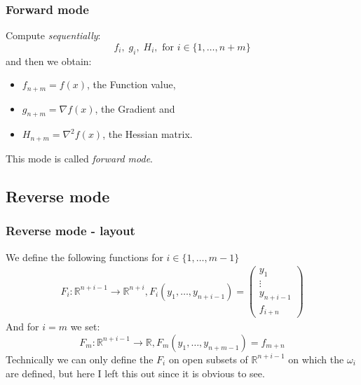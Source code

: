 \documentclass[compress]{beamer}
\def\R{{\mathbb R}}
\begin{document}
\begin{frame}
	\frametitle{Forward mode}

	Compute \textit{sequentially}:
	\[
		f_i, \; g_i, \; H_i, \text{ for } i \in \{
		1, \ldots, n+m
		\}
	\]
	and then we obtain:
	\vspace{5mm}
	\begin{itemize}
		\item $f_{n+m} = f(x)$, the Function value,
		\item $g_{n+m} = \nabla f(x)$, the Gradient and
		\item $H_{n+m} = \nabla ^2 f(x)$, the Hessian matrix.
	\end{itemize}
	\vspace{5mm}
	This mode is called \textit{forward mode}.
\end{frame}

\subsection{Reverse mode}
\begin{frame}
	\frametitle{Reverse mode - layout}

	We define the following functions for $i \in \{
		1, \ldots, m-1
		\} $
	\begin{align*}
		F_i : \R^{n+i - 1} \to \R^{n+i},
		F_i (y_1, \ldots, y_{n+i-1}) =
		\begin{pmatrix}
			y_1       \\
			\vdots    \\
			y_{n+i-1} \\
			f_{i+n}
		\end{pmatrix}
	\end{align*}
	And for $i=m$ we set:
	\[
		F_m : \R^{n+i - 1} \to \R,
		F_m \left(
		y_1, \ldots, y_{n+m-1}
		\right) = f_{m+n}
	\]
	Technically we can only define the $F_i$ on open subsets
	of $\R^{n+i-1}$ on which the $\omega_i$ are defined,
	but here I left this out since it is obvious to see.
\end{frame}
\end{document}
